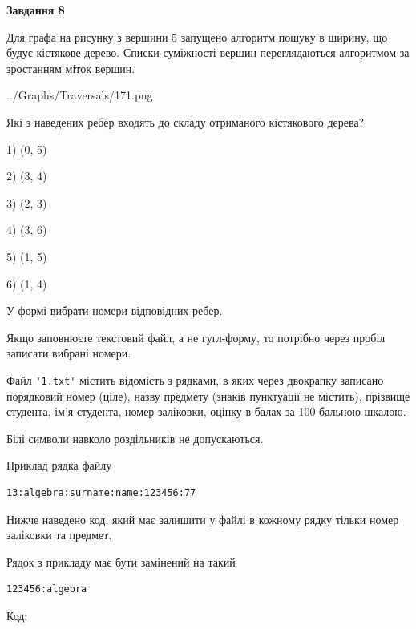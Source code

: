 \documentclass[12pt, ukrainian]{article}
\def\code#1{\Verb!#1!}
\begin{document}
{\begin {large}
{\begin {center}\textbf{Завдання 8}\end {center}}\par
Для графа на рисунку з вершини 5 запущено алгоритм пошуку в ширину, що будує кістякове дерево. Списки суміжності вершин переглядаються алгоритмом за зростанням міток вершин.\par
\begin{center}
	{../Graphs/Traversals/171.png}
\end{center}
\par Які з наведених ребер входять до складу отриманого кістякового дерева?\par
1) (0, 5)\par
2) (3, 4)\par
3) (2, 3)\par
4) (3, 6)\par
5) (1, 5)\par
6) (1, 4)\par
{\vskip 15pt} У формі вибрати номери відповідних ребер.


Якщо заповнюєте текстовий файл, а не гугл-форму, то потрібно через пробіл записа\-ти вибрані номери.\par
\newpage


Файл \code{'1.txt'} містить відомість з рядками, в яких через двокрапку записано поряд\-ковий номер (ціле), назву предмету (знаків пунктуації не містить), прізвище студента, ім'я студента, номер заліковки, оцінку в балах за 100 бальною шкалою.

Білі символи навколо роздільників не допускаються.

Приклад рядка файлу



\begin{verbatim}
13:algebra:surname:name:123456:77
\end{verbatim}


Нижче наведено код, який має залишити у файлі в кожному рядку тільки номер заліковки та предмет.

Рядок з прикладу має бути замінений на такий



\begin{verbatim}
123456:algebra
\end{verbatim}




Код:




\end{large}}
\end{document}
